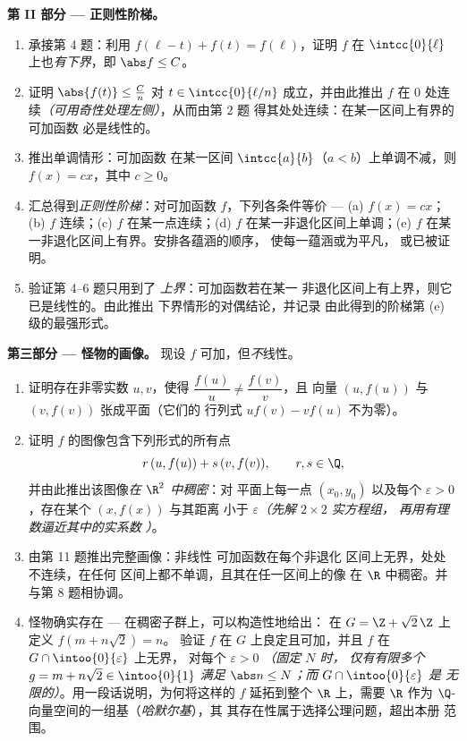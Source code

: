 \begin{problem}[{周末问题 --- $f(x + y) = f(x) + f(y)$：
正则性导出线性，以及“怪物”的画像}]
\medskip
\noindent\textbf{第 II 部分 --- 正则性阶梯。}
\begin{enumerate}[resume]
  \item 承接第 4 题：利用 $f(\ell - t) + f(t) =
        f(\ell)$，证明 $f$ 在
        $\intcc{0}{\ell}$ 上也\emph{有下界}，即 $\abs f \leq C$。
  \item 证明 $\abs{f(t)} \leq \frac{C}{n}$ 对 $t \in
        \intcc{0}{\ell/n}$ 成立，并由此推出 $f$ 在
        $0$ 处连续\emph{（可用奇性处理左侧）}，从而由第 2 题
        得其处处连续：在某一区间上有界的可加函数
        必是线性的。
  \item 推出单调情形：可加函数
        在某一区间 $\intcc{a}{b}$（$a < b$）上单调不减，则 $f(x)
        = cx$，其中 $c \geq 0$。
  \item 汇总得到\emph{正则性阶梯}：对可加函数
        $f$，下列各条件等价 --- (a) $f(x) = cx$；
        (b) $f$ 连续；(c) $f$ 在某一点连续；(d)
        $f$ 在某一非退化区间上单调；(e) $f$
        在某一非退化区间上有界。安排各蕴涵的顺序，
        使每一蕴涵或为平凡，
        或已被证明。
  \item 验证第 4--6 题只用到了
        \emph{上界}：可加函数若在某一
        非退化区间上有上界，则它已是线性的。由此推出
        下界情形的对偶结论，并记录
        由此得到的阶梯第 (e) 级的最强形式。
\end{enumerate}

\medskip
\noindent\textbf{第三部分 --- 怪物的画像。}
现设 $f$ 可加，但\emph{不}线性。
\begin{enumerate}[resume]
  \item 证明存在非零实数 $u, v$，使得
        $\dfrac{f(u)}{u} \neq \dfrac{f(v)}{v}$，且
        向量 $(u, f(u))$ 与 $(v, f(v))$ 张成平面（它们的
        行列式 $u f(v) - v f(u)$ 不为零）。
  \item 证明 $f$ 的图像包含下列形式的所有点
        \[
        r\,(u, f(u)) + s\,(v, f(v)), \qquad r, s \in \Q ,
        \]
        并由此推出该图像\emph{在 $\R^2$ 中稠密}：对
        平面上每一点 $(x_0, y_0)$ 以及每个
        $\varepsilon > 0$，存在某个 $(x, f(x))$ 与其距离
        小于 $\varepsilon$\emph{（先解 $2\times2$ 实方程组，
        再用有理数逼近其中的实系数
        ）}。
  \item 由第 11 题推出完整画像：非线性
        可加函数在每个非退化
        区间上无界，处处不连续，在任何
        区间上都不单调，且其在任一区间上的像
        在 $\R$ 中稠密。并与第 8 题相协调。
  \item 怪物确实存在 --- 在稠密子群上，可以构造性地给出：
        在 $G = \Z + \sqrt2\,\Z$ 上定义 $f(m + n\sqrt2) = n$。
        验证 $f$ 在 $G$ 上良定且可加，并且
        $f$ 在 $G \cap \intoo{0}{\varepsilon}$ 上无界，
        对每个 $\varepsilon > 0$ \emph{（固定 $N$ 时，
        仅有有限多个 $g = m + n\sqrt2 \in \intoo{0}{1}$ 满足
        $\abs n \leq N$；而 $G \cap \intoo{0}{\varepsilon}$ 是
        无限的）}。用一段话说明，为何将这样的
        $f$ 延拓到整个 $\R$ 上，需要 $\R$ 作为
        $\Q$-向量空间的一组基（\emph{哈默尔基}），其
        其存在性属于选择公理问题，超出本册
        范围。
\end{enumerate}


\end{problem}
